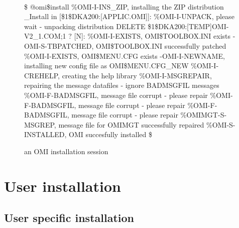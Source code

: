 \documentclass[a4paper]{book}
\begin{document}
\begin{figure}[h!tb]
\begin{minipage}[h!tb]{\textwidth}
\hrulefill \\
\begin{ttfamily}\begin{small}
{\$} @omi{\$}install  \newline
{\%}OMI-I-INS{\_}ZIP, installing the ZIP distribution \newline
{\_}Install in [{\$}1{\$}DKA200:[APPLIC.OMI]]: \newline
{\%}OMI-I-UNPACK, please wait - unpacking distribution \newline
DELETE {\$}1{\$}DKA200:[TEMP]OMI-V2{\_}1.COM;1 ? [N]: \newline
{\%}OMI-I-EXISTS, OMI{\$}TOOLBOX.INI exists \newline
-OMI-S-TBPATCHED, OMI{\$}TOOLBOX.INI successfully patched \newline
{\%}OMI-I-EXISTS, OMI{\$}MENU.CFG exists \newline
-OMI-I-NEWNAME, installing new config file as OMI{\$}MENU.CFG{\_}NEW \newline
{\%}OMI-I-CREHELP, creating the help library \newline
{\%}OMI-I-MSGREPAIR, repairing the message datafiles - ignore BADMSGFIL messages \newline
{\%}OMI-F-BADMSGFIL, message file corrupt - please repair \newline
{\%}OMI-F-BADMSGFIL, message file corrupt - please repair \newline
{\%}OMI-F-BADMSGFIL, message file corrupt - please repair \newline
{\%}OMIMGT-S-MSGREP, message file for OMIMGT successfully repaired \newline
{\%}OMI-S-INSTALLED, OMI succesfully installed \newline
{\$}
\end{small}\end{ttfamily}
\caption{an OMI installation session}\label{fig:systinst}
\hrulefill
\end{minipage}
\end{figure}


\section{User installation}
\label{subsec:mylabel1}

\subsection{User specific installation}
\label{subsubsec:mylabel1}
\end{document}
